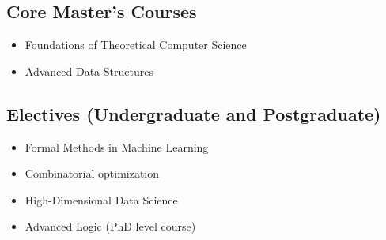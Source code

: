 \documentclass[11pt,a4paper,sans]{moderncv} %
\begin{document}
\subsection*{Core Master’s Courses}
\begin{varwidth}[t]{.5\textwidth}
\begin{itemize}
    \item Foundations of Theoretical Computer Science
\end{itemize}

\end{varwidth}%
\hspace{6.5em}%
\begin{varwidth}[t]{.5\textwidth}

 \begin{itemize}
    \item Advanced Data Structures
\end{itemize}
\end{varwidth}

\subsection*{Electives (Undergraduate and Postgraduate)}

\begin{varwidth}[t]{.5\textwidth}
\begin{itemize}
    \item Formal Methods in Machine Learning
    \item Combinatorial optimization
\end{itemize}

\end{varwidth}%
\hspace{10em}%
\begin{varwidth}[t]{.5\textwidth}
 \begin{itemize}
    \item High-Dimensional Data Science
    \item Advanced Logic (PhD level course)
\end{itemize}
\end{varwidth}%
\end{document}
